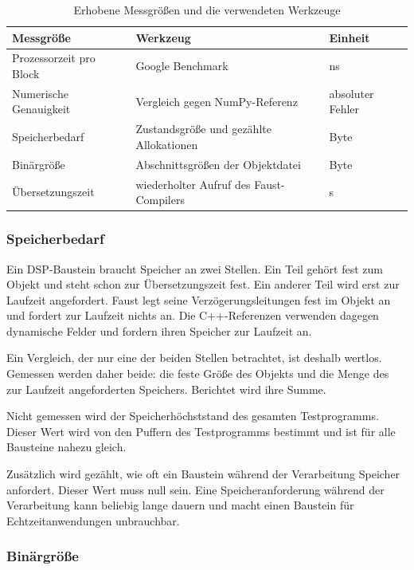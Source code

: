 \begin{table}[htb]
\centering
\caption{Erhobene Messgrößen und die verwendeten Werkzeuge}
\label{tab:messgroessen}
\begin{tabular}{lll}
\hline
Messgröße & Werkzeug & Einheit \\
\hline
Prozessorzeit pro Block & Google Benchmark & ns \\
Numerische Genauigkeit & Vergleich gegen NumPy-Referenz & absoluter Fehler \\
Speicherbedarf & Zustandsgröße und gezählte Allokationen & Byte \\
Binärgröße & Abschnittsgrößen der Objektdatei & Byte \\
Übersetzungszeit & wiederholter Aufruf des Faust-Compilers & s \\
\hline
\end{tabular}
\end{table}

\subsubsection*{Speicherbedarf}

Ein DSP-Baustein braucht Speicher an zwei Stellen. Ein Teil gehört fest zum
Objekt und steht schon zur Übersetzungszeit fest. Ein anderer Teil wird erst
zur Laufzeit angefordert. Faust legt seine Verzögerungsleitungen fest im
Objekt an und fordert zur Laufzeit nichts an. Die C++-Referenzen verwenden
dagegen dynamische Felder und fordern ihren Speicher zur Laufzeit an.

Ein Vergleich, der nur eine der beiden Stellen betrachtet, ist deshalb
wertlos. Gemessen werden daher beide: die feste Größe des Objekts und die
Menge des zur Laufzeit angeforderten Speichers. Berichtet wird ihre Summe.

Nicht gemessen wird der Speicherhöchststand des gesamten Testprogramms.
Dieser Wert wird von den Puffern des Testprogramms bestimmt und ist für alle
Bausteine nahezu gleich.

Zusätzlich wird gezählt, wie oft ein Baustein während der Verarbeitung
Speicher anfordert. Dieser Wert muss null sein. Eine Speicheranforderung
während der Verarbeitung kann beliebig lange dauern und macht einen Baustein
für Echtzeitanwendungen unbrauchbar.

\subsubsection*{Binärgröße}

